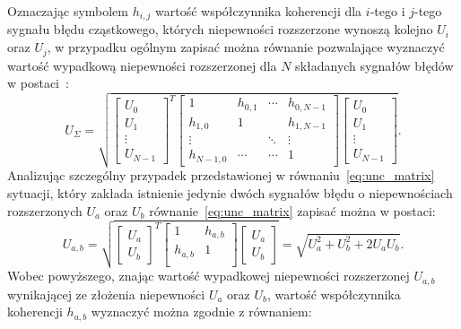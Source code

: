 Oznaczając symbolem $h_{i,j}$ wartość współczynnika koherencji dla $i$-tego i $j$-tego sygnału błędu cząstkowego, których niepewności rozszerzone wynoszą kolejno $U_{i}$ oraz $U_{j}$, w przypadku ogólnym zapisać można równanie pozwalające wyznaczyć wartość wypadkową niepewności rozszerzonej dla $N$ składanych sygnałów błędów w postaci~\cite{jakubiec_reductive}:
\begin{equation}
U_{\Sigma} = \sqrt{
\begin{bmatrix}
U_{0} \\ U_{1} \\ \vdots \\ U_{N-1}
\end{bmatrix}^{T}
\begin{bmatrix}
1         & h_{0,1} & \cdots & h_{0,N-1} \\
h_{1,0}   & 1       &        & h_{1,N-1} \\
\vdots    &         & \ddots & \vdots    \\
h_{N-1,0} & \cdots  & \cdots & 1
\end{bmatrix}
\begin{bmatrix}
U_{0} \\ U_{1} \\ \vdots \\ U_{N-1}
\end{bmatrix}}
\label{eq:unc_matrix}.
\end{equation}
Analizując szczególny przypadek przedstawionej w równaniu~\eqref{eq:unc_matrix} sytuacji, który zakłada istnienie jedynie dwóch sygnałów błędu o niepewnościach rozszerzonych $U_{a}$ oraz $U_{b}$ równanie~\eqref{eq:unc_matrix} zapisać można w postaci:
\begin{equation}
U_{a,b} = \sqrt{
\begin{bmatrix}
U_{a} \\ U_{b}
\end{bmatrix}^{T}
\begin{bmatrix}
1         & h_{a,b} \\
h_{a,b}   & 1       \\
\end{bmatrix}
\begin{bmatrix}
U_{a} \\ U_{b}
\end{bmatrix}} =
\sqrt{U_{a}^{2} + U_{b}^{2} + 2 U_{a} U_{b}}
\label{eq:unc_mattwo}.
\end{equation}
Wobec powyższego, znając wartość wypadkowej niepewności rozszerzonej $U_{a,b}$ wynikającej ze złożenia niepewności $U_{a}$ oraz $U_{b}$, wartość współczynnika koherencji $h_{a,b}$ wyznaczyć można zgodnie z równaniem:
